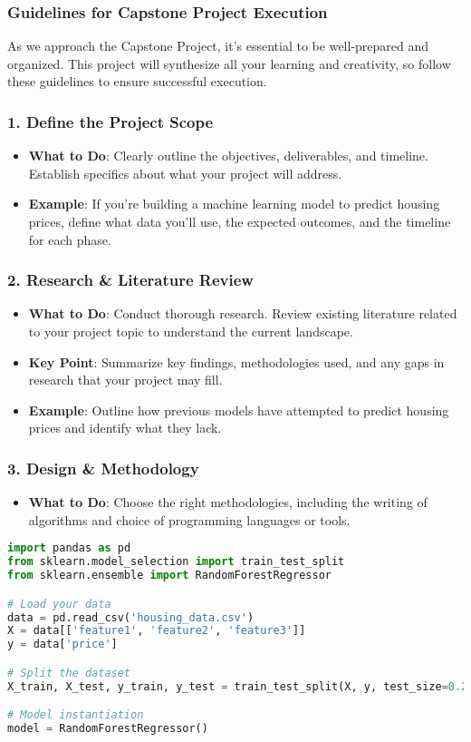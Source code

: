 \documentclass[aspectratio=169]{beamer}
\begin{document}
\begin{frame}
    \frametitle{Guidelines for Capstone Project Execution}
    As we approach the Capstone Project, it's essential to be well-prepared and organized. This project will synthesize all your learning and creativity, so follow these guidelines to ensure successful execution.
\end{frame}

\begin{frame}
    \frametitle{1. Define the Project Scope}
    \begin{itemize}
        \item \textbf{What to Do}: Clearly outline the objectives, deliverables, and timeline. Establish specifics about what your project will address.
        \item \textbf{Example}: If you're building a machine learning model to predict housing prices, define what data you'll use, the expected outcomes, and the timeline for each phase.
    \end{itemize}
\end{frame}

\begin{frame}
    \frametitle{2. Research \& Literature Review}
    \begin{itemize}
        \item \textbf{What to Do}: Conduct thorough research. Review existing literature related to your project topic to understand the current landscape.
        \item \textbf{Key Point}: Summarize key findings, methodologies used, and any gaps in research that your project may fill.
        \item \textbf{Example}: Outline how previous models have attempted to predict housing prices and identify what they lack.
    \end{itemize}
\end{frame}

\begin{frame}
    \frametitle{3. Design \& Methodology}
    \begin{itemize}
        \item \textbf{What to Do}: Choose the right methodologies, including the writing of algorithms and choice of programming languages or tools.
    \end{itemize}
    \begin{lstlisting}[language=Python]
import pandas as pd
from sklearn.model_selection import train_test_split
from sklearn.ensemble import RandomForestRegressor

# Load your data
data = pd.read_csv('housing_data.csv')
X = data[['feature1', 'feature2', 'feature3']]
y = data['price']

# Split the dataset
X_train, X_test, y_train, y_test = train_test_split(X, y, test_size=0.2)

# Model instantiation 
model = RandomForestRegressor()
    \end{lstlisting}
\end{frame}
\end{document}
